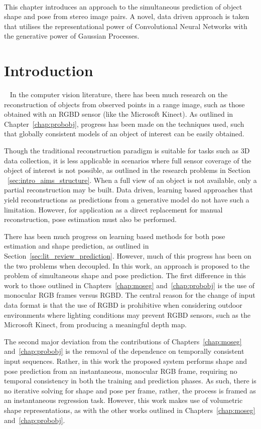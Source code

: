 ~\label{chap:spp}
\begin{chapterabstract}
This chapter introduces an approach to the simultaneous prediction of object shape 
and pose from stereo image pairs. A novel, data driven approach is taken that utilises 
the representational power of Convolutional Neural Networks with the generative power of 
Gaussian Processes.
\end{chapterabstract}

\section{Introduction}
~\label{sec:spp_introduction}
In the computer vision literature, there has been much research on the reconstruction of objects
from observed points in a range image, such as those obtained with an RGBD sensor (like 
the Microsoft Kinect). As outlined in Chapter~\ref{chap:probobj}, progress has been made 
on the techniques used, such that globally consistent models of an object of interest can be 
easily obtained.

Though the traditional reconstruction paradigm is suitable for tasks such as 3D data 
collection, it is less applicable in scenarios where full sensor coverage of the object 
of interest is not possible, as outlined in the research problems in Section
~\ref{sec:intro_aims_structure}. When a full view of an object is not available, only a 
partial reconstruction may be built. Data driven, learning based approaches that yield 
reconstructions as predictions from a generative model do not have such a limitation. 
However, for application as a direct replacement for manual reconstruction, pose estimation 
must also be performed.

There has been much progress on learning based methods for both pose estimation and 
shape prediction, as outlined in Section~\ref{sec:lit_review_prediction}. However, much of 
this progress has been on the two problems when decoupled. In this work, an approach is 
proposed to the problem of simultaneous shape and pose prediction. The first 
difference in this work to those outlined in Chapters~\ref{chap:moseg} and~\ref{chap:probobj} 
is the use of monocular RGB frames versus RGBD\@. The central reason for the change of input data 
format is that the use of RGBD is prohibitive when considering outdoor environments where lighting 
conditions may prevent RGBD sensors, such as the Microsoft Kinect, from producing a meaningful depth map.

The second major deviation from the contributions of Chapters~\ref{chap:moseg} and~\ref{chap:probobj} 
is the removal of the dependence on temporally consistent input sequences. Rather, in this work 
the proposed system performs shape and pose prediction from an instantaneous, monocular RGB frame, 
requiring no temporal consistency in both the training and prediction phases. As such, there is no 
iterative solving for shape and pose per frame, rather, the process is framed as an instantaneous 
regression task. However, this work makes use of volumetric shape representations, as with the other 
works outlined in Chapters~\ref{chap:moseg} and~\ref{chap:probobj}.


